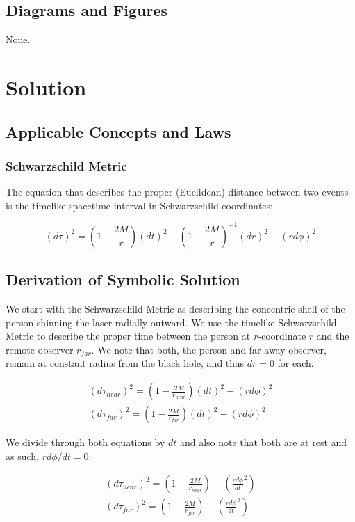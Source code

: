 \documentclass[]{report}
\begin{document}
      \subsection{Diagrams and Figures}
        None.

    \section{Solution}
      \subsection{Applicable Concepts and Laws}
        \subsubsection{Schwarzschild Metric}
          The equation that describes the proper (Euclidean) distance between two events is the timelike spacetime interval in Schwarzschild coordinates:

          $$ (d\tau)^2 = \left(1 - \frac{2M}{r}\right)(dt)^2 - \left(1 - \frac{2M}{r}\right)^{-1}(dr)^2 - (rd\phi)^2 $$

      \subsection{Derivation of Symbolic Solution}
        We start with the Schwarzschild Metric as describing the concentric shell of the person shinning the laser radially outward. We use the timelike Schwarzschild Metric to describe the proper time between the person at $r$-coordinate $r$ and the remote observer $r_{far}$. We note that both, the person and far-away observer, remain at constant radius from the black hole, and thus $dr = 0$ for each.

        \begin{equation*}
          \begin{split}
            (d\tau_{near})^2 = \left(1 - \frac{2M}{r_{near}}\right)(dt)^2 - (rd\phi)^2 \\
            (d\tau_{far})^2 = \left(1 - \frac{2M}{r_{far}}\right)(dt)^2 - (rd\phi)^2
            \end{split}
        \end{equation*}

        We divide through both equations by $dt$ and also note that both are at rest and as such, $rd\phi/dt = 0$:

        \begin{equation*}
          \begin{split}
          (d\tau_{near})^2 = \left(1 - \frac{2M}{r_{near}}\right) - \left(\frac{rd\phi}{dt}^2\right) \\
          (d\tau_{far})^2 = \left(1 - \frac{2M}{r_{far}}\right) - \left(\frac{rd\phi}{dt}^2\right)
          \end{split}
        \end{equation*}
\end{document}
